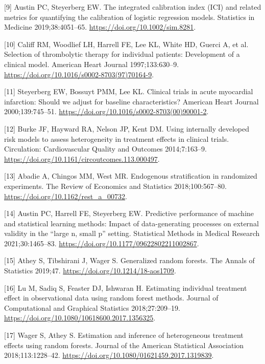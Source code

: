 \documentclass{article}
\newenvironment{cslreferences}%
  {}%
  {\par}
\begin{document}
\begin{cslreferences}
\leavevmode\hypertarget{ref-Austin2019}{}%
{[}9{]} Austin PC, Steyerberg EW. The integrated calibration index (ICI)
and related metrics for quantifying the calibration of logistic
regression models. Statistics in Medicine 2019;38:4051--65.
\url{https://doi.org/10.1002/sim.8281}.

\leavevmode\hypertarget{ref-Califf1997}{}%
{[}10{]} Califf RM, Woodlief LH, Harrell FE, Lee KL, White HD, Guerci A,
et al. Selection of thrombolytic therapy for individual patients:
Development of a clinical model. American Heart Journal 1997;133:630--9.
\url{https://doi.org/10.1016/s0002-8703(97)70164-9}.

\leavevmode\hypertarget{ref-Steyerberg2000}{}%
{[}11{]} Steyerberg EW, Bossuyt PMM, Lee KL. Clinical trials in acute
myocardial infarction: Should we adjust for baseline characteristics?
American Heart Journal 2000;139:745--51.
\url{https://doi.org/10.1016/s0002-8703(00)90001-2}.

\leavevmode\hypertarget{ref-Burke2014}{}%
{[}12{]} Burke JF, Hayward RA, Nelson JP, Kent DM. Using internally
developed risk models to assess heterogeneity in treatment effects in
clinical trials. Circulation: Cardiovascular Quality and Outcomes
2014;7:163--9. \url{https://doi.org/10.1161/circoutcomes.113.000497}.

\leavevmode\hypertarget{ref-Abadie2018}{}%
{[}13{]} Abadie A, Chingos MM, West MR. Endogenous stratification in
randomized experiments. The Review of Economics and Statistics
2018;100:567--80. \url{https://doi.org/10.1162/rest_a_00732}.

\leavevmode\hypertarget{ref-Austin2021}{}%
{[}14{]} Austin PC, Harrell FE, Steyerberg EW. Predictive performance of
machine and statistical learning methods: Impact of data-generating
processes on external validity in the ``large n, small p'' setting.
Statistical Methods in Medical Research 2021;30:1465--83.
\url{https://doi.org/10.1177/09622802211002867}.

\leavevmode\hypertarget{ref-Athey2019}{}%
{[}15{]} Athey S, Tibshirani J, Wager S. Generalized random forests. The
Annals of Statistics 2019;47. \url{https://doi.org/10.1214/18-aos1709}.

\leavevmode\hypertarget{ref-Lu2018}{}%
{[}16{]} Lu M, Sadiq S, Feaster DJ, Ishwaran H. Estimating individual
treatment effect in observational data using random forest methods.
Journal of Computational and Graphical Statistics 2018;27:209--19.
\url{https://doi.org/10.1080/10618600.2017.1356325}.

\leavevmode\hypertarget{ref-Wager2018}{}%
{[}17{]} Wager S, Athey S. Estimation and inference of heterogeneous
treatment effects using random forests. Journal of the American
Statistical Association 2018;113:1228--42.
\url{https://doi.org/10.1080/01621459.2017.1319839}.
\end{cslreferences}

\setlength{\parindent}{0in}
\setlength{\leftskip}{0in}

\noindent



\end{document}
